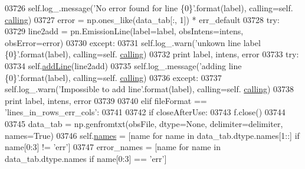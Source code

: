 \begin{DoxyCode}
{{{{{{{{{{{{{{{{{{{{{{03726                         self.log\_.message(\textcolor{stringliteral}{'No error found for line \{0\}'}.format(label), calling=self.
      \hyperlink{classpyneb_1_1core_1_1pynebcore_1_1_observation_a2639fad9af4fefad20e4097295bd40e7}{calling})
03727                         error = np.ones\_like(data\_tab[:, 1]) * err\_default
03728                     \textcolor{keywordflow}{try}:
03729                         line2add = pn.EmissionLine(label=label, obsIntens=intens, obsError=error)
03730                     \textcolor{keywordflow}{except}:
03731                         self.log\_.warn(\textcolor{stringliteral}{'unkown line label \{0\}'}.format(label), calling=self.
      \hyperlink{classpyneb_1_1core_1_1pynebcore_1_1_observation_a2639fad9af4fefad20e4097295bd40e7}{calling})
03732                         \textcolor{keywordflow}{print} label, intens, error 
03733                     \textcolor{keywordflow}{try}:
03734                         self.\hyperlink{classpyneb_1_1core_1_1pynebcore_1_1_observation_a5f4b01dbeb8d50963fb7fa21b94bfc17}{addLine}(line2add)
03735                         self.log\_.message(\textcolor{stringliteral}{'adding line \{0\}'}.format(label), calling=self.
      \hyperlink{classpyneb_1_1core_1_1pynebcore_1_1_observation_a2639fad9af4fefad20e4097295bd40e7}{calling})
03736                     \textcolor{keywordflow}{except}:
03737                         self.log\_.warn(\textcolor{stringliteral}{'Impossible to add line'}.format(label), calling=self.
      \hyperlink{classpyneb_1_1core_1_1pynebcore_1_1_observation_a2639fad9af4fefad20e4097295bd40e7}{calling})
03738                         \textcolor{keywordflow}{print} label, intens, error
03739                         
03740         \textcolor{keywordflow}{elif} fileFormat == \textcolor{stringliteral}{'lines\_in\_rows\_err\_cols'}:
03741             
03742             \textcolor{keywordflow}{if} closeAfterUse:
03743                 f.close()
03744                 
03745             data\_tab = np.genfromtxt(obsFile, dtype=\textcolor{keywordtype}{None}, delimiter=delimiter, names=\textcolor{keyword}{True})
03746             self.\hyperlink{classpyneb_1_1core_1_1pynebcore_1_1_observation_a3f365d0b1488b2eba300bf71caf23c17}{names} = [name \textcolor{keywordflow}{for} name \textcolor{keywordflow}{in} data\_tab.dtype.names[1::] \textcolor{keywordflow}{if} name[0:3] != \textcolor{stringliteral}{'err'}]
03747             error\_names = [name \textcolor{keywordflow}{for} name \textcolor{keywordflow}{in} data\_tab.dtype.names \textcolor{keywordflow}{if} name[0:3] == \textcolor{stringliteral}{'err'}]
}}}}}}}}}}}}}}}}}}}}}}
\end{DoxyCode}
